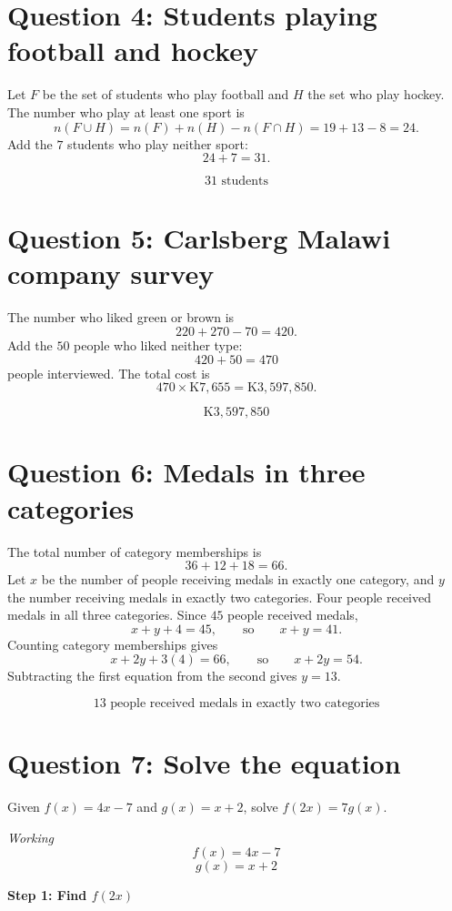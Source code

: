 \documentclass[11pt]{article}
\begin{document}
\section*{Question 4: Students playing football and hockey}

Let \(F\) be the set of students who play football and \(H\) the set who play hockey. The number who play at least one sport is
\[
n(F\cup H)=n(F)+n(H)-n(F\cap H)=19+13-8=24.
\]
Add the \(7\) students who play neither sport:
\[
24+7=31.
\]

\[
\boxed{31\text{ students}}
\]

\section*{Question 5: Carlsberg Malawi company survey}

The number who liked green or brown is
\[
220+270-70=420.
\]
Add the \(50\) people who liked neither type:
\[
420+50=470
\]
people interviewed. The total cost is
\[
470\times \mathrm{K}7{,}655=\mathrm{K}3{,}597{,}850.
\]

\[
\boxed{\mathrm{K}3{,}597{,}850}
\]

\section*{Question 6: Medals in three categories}

The total number of category memberships is
\[
36+12+18=66.
\]
Let \(x\) be the number of people receiving medals in exactly one category, and \(y\) the number receiving medals in exactly two categories. Four people received medals in all three categories. Since \(45\) people received medals,
\[
x+y+4=45,
\qquad\text{so}\qquad
x+y=41.
\]
Counting category memberships gives
\[
x+2y+3(4)=66,
\qquad\text{so}\qquad
x+2y=54.
\]
Subtracting the first equation from the second gives \(y=13\).

\[
\boxed{13\text{ people received medals in exactly two categories}}
\]

\section*{Question 7: Solve the equation}

Given \(f(x)= 4x-7\) and \(g(x)=x+2\), solve \(f(2x)=7g(x)\).

\textit{Working}
\[
f(x) = 4x - 7
\]
\[
g(x) = x + 2
\]

\textbf{Step 1: Find \(f(2x)\)}
\end{document}
